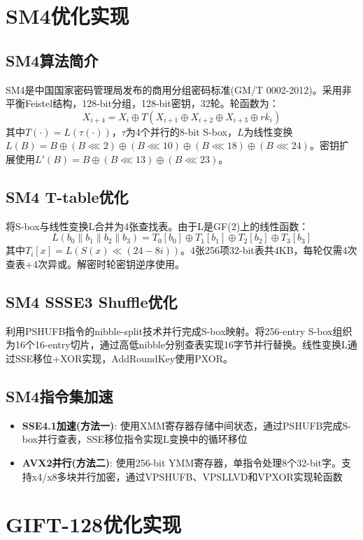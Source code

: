 \documentclass[12pt,a4paper]{ctexart}
\begin{document}
\newpage
\section{SM4优化实现}

\subsection{SM4算法简介}
SM4是中国国家密码管理局发布的商用分组密码标准(GM/T 0002-2012)。采用非平衡Feistel结构，128-bit分组，128-bit密钥，32轮。轮函数为：
\[X_{i+4}=X_i\oplus T(X_{i+1}\oplus X_{i+2}\oplus X_{i+3}\oplus rk_i)\]
其中$T(\cdot)=L(\tau(\cdot))$，$\tau$为4个并行的8-bit S-box，$L$为线性变换$L(B)=B\oplus(B\lll2)\oplus(B\lll10)\oplus(B\lll18)\oplus(B\lll24)$。密钥扩展使用$L'(B)=B\oplus(B\lll13)\oplus(B\lll23)$。

\subsection{SM4 T-table优化}
将S-box与线性变换L合并为4张查找表。由于L是GF(2)上的线性函数：
\[L(b_0\|b_1\|b_2\|b_3)=T_0[b_0]\oplus T_1[b_1]\oplus T_2[b_2]\oplus T_3[b_3]\]
其中$T_i[x]=L(S(x)\ll (24-8i))$。4张256项32-bit表共4KB，每轮仅需4次查表+4次异或。解密时轮密钥逆序使用。

\subsection{SM4 SSSE3 Shuffle优化}
利用PSHUFB指令的nibble-split技术并行完成S-box映射。将256-entry S-box组织为16个16-entry切片，通过高低nibble分别查表实现16字节并行替换。线性变换L通过SSE移位+XOR实现，AddRoundKey使用PXOR。

\subsection{SM4指令集加速}
\begin{itemize}[itemsep=2pt]
\item \textbf{SSE4.1加速(方法一)}: 使用XMM寄存器存储中间状态，通过PSHUFB完成S-box并行查表，SSE移位指令实现L变换中的循环移位
\item \textbf{AVX2并行(方法二)}: 使用256-bit YMM寄存器，单指令处理8个32-bit字。支持x4/x8多块并行加密，通过VPSHUFB、VPSLLVD和VPXOR实现轮函数
\end{itemize}

\newpage
\section{GIFT-128优化实现}
\end{document}
